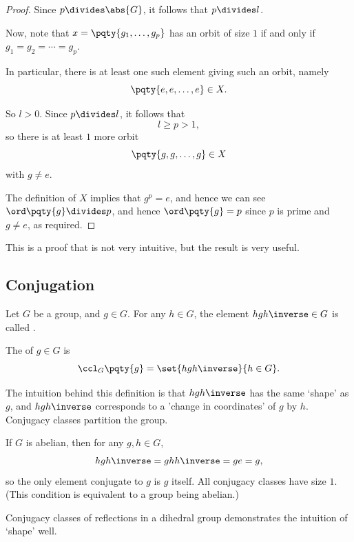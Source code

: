 \begin{proof}
    Since \(p \divides \abs{G}\), it follows that \(p \divides l\).

    Now, note that \(x = \pqty{g_1, \ldots, g_p}\) has an orbit of size \(1\) if and only if \(g_1 = g_2 = \cdots = g_p\).

    In particular, there is at least one such element giving such an orbit, namely
    \[
        \pqty{e, e, \ldots, e} \in X.
    \]

    So \(l > 0\). Since \(p \divides l\), it follows that
    \[
        l \geq p > 1,
    \]
    so there is at least \(1\) more orbit
    \[
        \pqty{g, g, \ldots, g} \in X
    \]
    with \(g \neq e\).

    The definition of \(X\) implies that \(g^p = e\), and hence we can see \(\ord\pqty{g} \divides p\), and hence \(\ord\pqty{g} = p\) since \(p\) is prime and \(g \neq e\), as required.
\end{proof}

This is a proof that is not very intuitive, but the result is very useful.

\subsection{Conjugation}
\label{sec:conjugation}

\begin{definition}
    \label{def:conjugate-ccl}%
    Let \(G\) be a group, and \(g \in G\). For any \(h \in G\), the element \(hgh\inverse \in G\) is called .

    The  of \(g \in G\) is
    \[
        \ccl_{G}\pqty{g} = \set{hgh\inverse}{h \in G}.
    \]
\end{definition}

The intuition behind this definition is that \(hgh\inverse\) has the same `shape' as \(g\), and \(hgh\inverse\) corresponds to a 'change in coordinates' of \(g\) by \(h\). Conjugacy classes partition the group.

\begin{example*}
    If \(G\) is abelian, then for any \(g, h \in G\),
    \[
        hgh\inverse = ghh\inverse = ge = g,
    \]
    so the only element conjugate to \(g\) is \(g\) itself. All conjugacy classes have size \(1\). (This condition is equivalent to a group being abelian.)
\end{example*}

Conjugacy classes of reflections in a dihedral group demonstrates the intuition of `shape' well.

